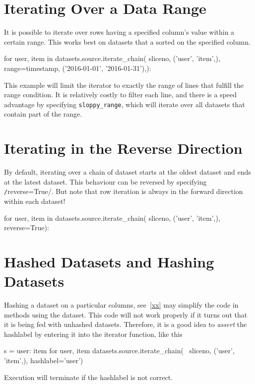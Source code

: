 \section{Iterating Over a Data Range}
It is possible to iterate over rows having a specified column's value
within a certain range.  This works best on datasets that a sorted on
the specified column.  
\begin{python}
for user, item in datasets.source.iterate_chain(
    sliceno, ('user', 'item',),
    range={timestamp, ('2016-01-01', '2016-01-31'),}):
\end{python}
This example will limit the iterator to exactly the range of lines
that fulfill the range condition.  It is relatively costly to filter
each line, and there is a speed advantage by specifying
\texttt{sloppy\_range}, which will iterate over all datasets that
contain part of the range.



\section{Iterating in the Reverse Direction}
By default, iterating over a chain of dataset starts at the oldest
dataset and ends at the latest dataset.  This behaviour can be
reversed by specifying \texttt/reverse=True/.  But note
that row iteration is always in the forward direction within each
dataset!
\begin{python}
for user, item in datasets.source.iterate_chain(
    sliceno, ('user', 'item',),
    reverse=True):
\end{python}



\section{Hashed Datasets and Hashing Datasets}
Hashing a dataset on a particular columns, see~\ref{xx} may simplify
the code in methods using the dataset.  This code will not work
properly if it turns out that it is being fed with unhashed datasets.
Therefore, it is a good idea to \emph{assert} the hashlabel by
entering it into the iterator function, like this
\begin{python}
s = {user: item for user, item datasets.source.iterate_chain( \
     sliceno, ('user', 'item',), hashlabel='user')}
\end{python}
Execution will terminate if the hashlabel is not correct.

